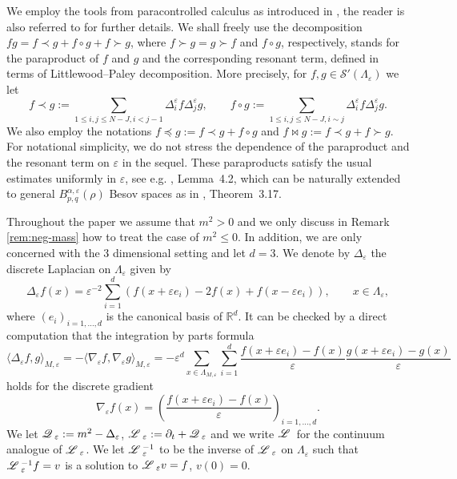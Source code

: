 \documentclass[a4paper,11pt]{article}
\newcommand{\assign}{:=}
\numberwithin{equation}{section}
\newcommand{\LL}{\mathscr{L} \hspace{.2em}}
\newcommand{\Q}{\mathscr{Q} \hspace{.2em}}
\begin{document}
\medskip


We employ the tools from paracontrolled calculus as
introduced in {\cite{GIP}}, the reader is also referred to {\cite{BCD}} for
further details. We shall  freely use the decomposition $f g = f \prec g +
f \circ g + f \succ g$, where $f \succ g = g \succ f$ and $f \circ g$,
respectively, stands for the paraproduct of $f$ and $g$ and the corresponding
resonant term, defined in terms of Littlewood--Paley decomposition. More
precisely, for $f, g \in \mathcal{S}' (\Lambda_{\varepsilon})$ we let
\[ f \prec g \assign \sum_{1 \leqslant i, j \leqslant N - J, i < j - 1}
   \Delta^{\varepsilon}_i f \Delta^{\varepsilon}_j g, \qquad f \circ g \assign
   \sum_{1 \leqslant i, j \leqslant N - J, i \sim j} \Delta^{\varepsilon}_i f
   \Delta^{\varepsilon}_j g. \]
   We also employ the notations $f\preccurlyeq g:= f\prec g+f\circ g$ and $f\Join g:=f\prec g+f\succ g$.
For notational simplicity, we do not stress the dependence of the paraproduct
and the resonant term on $\varepsilon$ in the sequel. These paraproducts
satisfy the usual estimates uniformly in $\varepsilon$, see e.g.
{\cite{MP17}}, Lemma~4.2, which can be naturally extended to general
$B^{\alpha, \varepsilon}_{p, q} (\rho)$ Besov spaces as in {\cite{MW17}},
Theorem~3.17.   



\medskip


Throughout the paper we assume that $m^{2}>0$ and we only discuss in Remark \ref{rem:neg-mass} how to treat the case of $m^{2}\leqslant0$. In addition,  we are only concerned with the 3 dimensional setting and let $d = 3$. We denote by $\Delta_{\varepsilon}$ the discrete Laplacian on $\Lambda_{\varepsilon}$
given by
\[ \Delta_{\varepsilon} f (x) = \varepsilon^{- 2} \sum_{i = 1}^d (f (x +
   \varepsilon e_i) - 2 f (x) + f (x - \varepsilon e_i)), \qquad x \in
   \Lambda_{\varepsilon}, \]
where $(e_i)_{i = 1, \ldots, d}$ is the canonical basis of $\mathbb{R}^d$.  It
can be checked by a direct computation that the integration by parts formula
\[ \langle \Delta_{\varepsilon} f, g \rangle_{M, \varepsilon} = - \langle
   \nabla_{\varepsilon} f, \nabla_{\varepsilon} g \rangle_{M, \varepsilon} = -
   \varepsilon^d \sum_{x \in \Lambda_{M, \varepsilon}} \sum_{i = 1}^d \frac{f
   (x + \varepsilon e_i) - f (x)}{\varepsilon}  \frac{g (x + \varepsilon e_i)
   - g (x)}{\varepsilon} \]
holds for the discrete gradient
\[ \nabla_{\varepsilon} f (x) = \left( \frac{f (x + \varepsilon e_i) - f
   (x)}{\varepsilon} \right)_{i = 1, \ldots, d} . \]
We let $\Q_{\varepsilon} \assign m^{2} - \Delta_{\varepsilon}$,  $\LL_{\varepsilon} \assign \partial_t +
\Q_{\varepsilon}$ and we write $\LL$ for the continuum analogue of $\LL_{\varepsilon}$.  We let $\LL_{\varepsilon}^{- 1}$ to be the inverse of
$\LL_{\varepsilon}$ on $\Lambda_{\varepsilon}$ such that $\LL_{\varepsilon}^{-
1} f = v$ is a solution to $\LL_{\varepsilon} v = f$, $v (0) = 0.$
\end{document}
